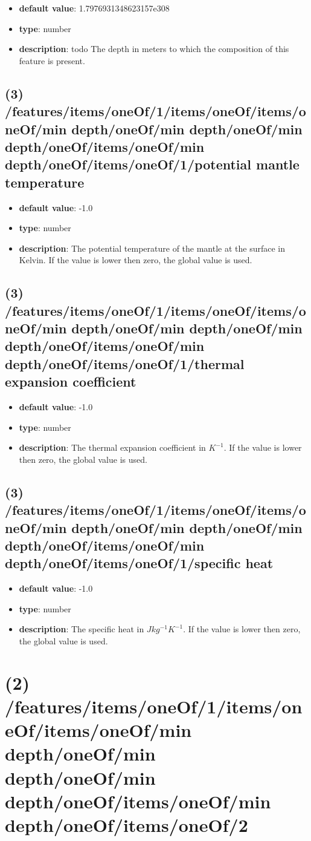 \begin{itemize}[leftmargin=3em]\item {\bf default value}: 1.7976931348623157e308
\item {\bf type}: number
\item {\bf description}: todo The depth in meters to which the composition of this feature is present.
\end{itemize}\subsection{(3) /features/items/oneOf/1/items/oneOf/items/oneOf/min depth/oneOf/min depth/oneOf/min depth/oneOf/items/oneOf/min depth/oneOf/items/oneOf/1/potential mantle temperature}
\begin{itemize}[leftmargin=3em]\item {\bf default value}: -1.0
\item {\bf type}: number
\item {\bf description}: The potential temperature of the mantle at the surface in Kelvin. If the value is lower then zero, the global value is used.
\end{itemize}\subsection{(3) /features/items/oneOf/1/items/oneOf/items/oneOf/min depth/oneOf/min depth/oneOf/min depth/oneOf/items/oneOf/min depth/oneOf/items/oneOf/1/thermal expansion coefficient}
\begin{itemize}[leftmargin=3em]\item {\bf default value}: -1.0
\item {\bf type}: number
\item {\bf description}: The thermal expansion coefficient in $K^{-1}$. If the value is lower then zero, the global value is used.
\end{itemize}\subsection{(3) /features/items/oneOf/1/items/oneOf/items/oneOf/min depth/oneOf/min depth/oneOf/min depth/oneOf/items/oneOf/min depth/oneOf/items/oneOf/1/specific heat}
\begin{itemize}[leftmargin=3em]\item {\bf default value}: -1.0
\item {\bf type}: number
\item {\bf description}: The specific heat in $J kg^{-1} K^{-1}$. If the value is lower then zero, the global value is used.
\end{itemize}\section{(2) /features/items/oneOf/1/items/oneOf/items/oneOf/min depth/oneOf/min depth/oneOf/min depth/oneOf/items/oneOf/min depth/oneOf/items/oneOf/2}
